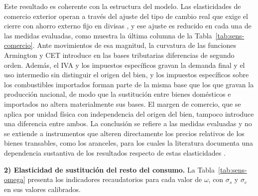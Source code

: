 \documentclass[11pt]{article}
\begin{document}
Este resultado es coherente con la estructura del modelo. Las elasticidades de comercio exterior operan a través del ajuste del tipo de cambio real que exige el cierre con ahorro externo fijo en divisas \cite{demelo_robinson_1989}, y ese ajuste es reducido en cada una de las medidas evaluadas, como muestra la última columna de la Tabla~\ref{tab:sens-comercio}. Ante movimientos de esa magnitud, la curvatura de las funciones Armington y CET introduce en las bases tributarias diferencias de segundo orden. Además, el IVA y los impuestos específicos gravan la demanda final y el uso intermedio sin distinguir el origen del bien, y los impuestos específicos sobre los combustibles importados forman parte de la misma base que los que gravan la producción nacional, de modo que la sustitución entre bienes domésticos e importados no altera materialmente sus bases. El margen de comercio, que se aplica por unidad física con independencia del origen del bien, tampoco introduce una diferencia entre ambos. La conclusión se refiere a las medidas evaluadas y no se extiende a instrumentos que alteren directamente los precios relativos de los bienes transables, como los aranceles, para los cuales la literatura documenta una dependencia sustantiva de los resultados respecto de estas elasticidades \cite{hertel_etal_2007}.

\textbf{2) Elasticidad de sustitución del resto del consumo.} La Tabla~\ref{tab:sens-omega} presenta los indicadores recaudatorios para cada valor de $\omega$, con $\sigma_{s}$ y $\sigma_{c}$ en sus valores calibrados.
\end{document}
